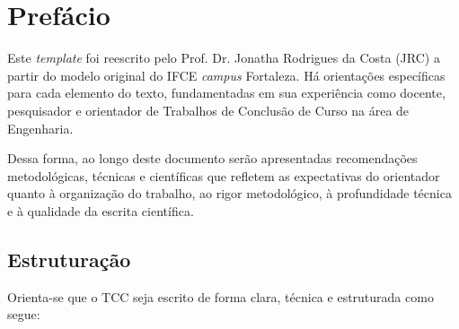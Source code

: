 \chapter{Prefácio}
Este \textit{template} foi reescrito pelo Prof. Dr. Jonatha Rodrigues da Costa (JRC) a partir do modelo original do IFCE \textit{campus} Fortaleza. Há orientações específicas para cada elemento do texto, fundamentadas em sua experiência como docente, pesquisador e orientador de Trabalhos de Conclusão de Curso na área de Engenharia.

Dessa forma, ao longo deste documento serão apresentadas recomendações metodológicas, técnicas e científicas que refletem as expectativas do orientador quanto à organização do trabalho, ao rigor metodológico, à profundidade técnica e à qualidade da escrita científica.
%

\section{Estruturação}
Orienta-se que o TCC seja escrito de forma clara, técnica e estruturada como segue:

